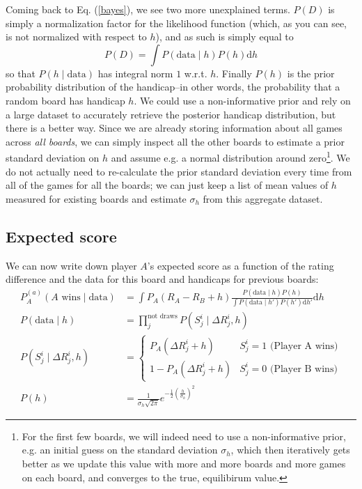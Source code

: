 \documentclass[12pt]{article}
\begin{document}
	Coming back to Eq. (\ref{bayes}), we see two more unexplained terms. $P(D)$ is simply a normalization factor for the likelihood function (which, as you can see, is not normalized with respect to $h$), and as such is simply equal to
	\begin{equation}\label{likelihood_normalization}
	P(D) = \int P(\text{data}\mid h)P(h) \text{d}h
	\end{equation}
	so that $P(h\mid\text{data})$ has integral norm $1$ w.r.t. $h$. Finally $P(h)$ is the prior probability distribution of the handicap--in other words, the probability that a random board has handicap $h$. We could use a non-informative prior and rely on a large dataset to accurately retrieve the posterior handicap distribution, but there is a better way. Since we are already storing information about all games across \textit{all boards}, we can simply inspect all the other boards to estimate a prior standard deviation on $h$ and assume e.g. a normal distribution around zero\footnote{For the first few boards, we will indeed need to use a non-informative prior, e.g. an initial guess on the standard deviation $\sigma_h$, which then iteratively gets better as we update this value with more and more boards and more games on each board, and converges to the true, equilibirum value.}. We do not actually need to re-calculate the prior standard deviation every time from all of the games for all the boards; we can just keep a list of mean values of $h$ measured for existing boards and estimate $\sigma_h$ from this aggregate dataset.
	
	\subsection{Expected score}
	
	We can now write down player $A$'s expected score as a function of the rating difference and the data for this board and handicaps for previous boards:
	\begin{align} \label{expectancy_based_on_data}
	P^{(a)}_A(A\text{ wins}\mid\text{data}) &= \int P_A(R_A - R_B + h) \frac{P(\text{data}\mid h)P(h)}{\int P(\text{data}\mid h')P(h') \text{d}h'} \text{d}h \\
	P(\text{data}\mid h) &= \prod_j^{\text{not draws}} P(S^i_j\mid\Delta R^i_j, h)\nonumber \\
	P(S^i_j\mid\Delta R^i_j, h)&=\begin{cases} 
      P_A(\Delta R^i_j + h) & S^i_j = 1\text{ (Player A wins)} \\
      1 - P_A(\Delta R^i_j + h) & S^i_j = 0\text{ (Player B wins)}
   \end{cases} \nonumber\\
   P(h) &= \frac{1}{\sigma_h\sqrt{2\pi}}e^{-\frac{1}{2}\left(\frac{h}{\sigma_h}\right)^2} \nonumber
	\end{align}
	
\end{document}
